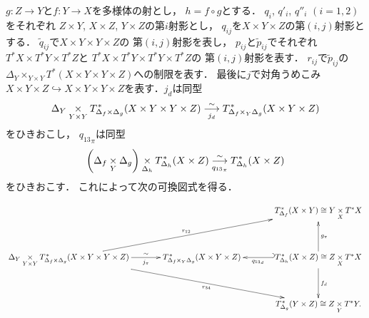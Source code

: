 \documentclass[leqno, 10pt, a4paper, dvipdfmx]{jsarticle}
\theoremstyle{definition}
\numberwithin{equation}{section}
\newcommand{\mres}[2][]{{\left.{#1}\right\rvert}_{#2}}
\newcommand{\dpb}[1][]{\mathbin{\mathop{\times}\limits_{#1}}}
\newcommand{\tpb}[1][]{\mathbin{\mathop{\times}\nolimits_{#1}}}
\theoremstyle{mystyle}
\newcommand{\mpb}[1][]{{#1}_{\pi}} %
\newcommand{\mdiff}[1][]{{#1}_{d}} %
\newcommand{\cotb}[1][]{T^{\ast}{#1}}
\newcommand{\conm}[2][]{T_{#1}^{\hspace{0.7pt}\ast}{#2}}
\newcommand{\diag}[1][]{\Delta_{#1}}
\begin{document}
\(g\colon Z\to Y\)と\(f\colon Y\to X\)を多様体の射とし，
\(h=f\circ g\)とする．
\(q_i\), \(q'_i\), \(q''_i\) \((i=1,2)\)をそれぞれ
\(Z\times Y\), \(X\times Z\), \(Y\times Z\)の第\(i\)射影とし，
\(q_{ij}\)を\(X\times Y\times Z\)の第\((i,j)\)射影とする．
\(\widetilde{q}_{ij}\)で\(X\times Y\times Y\times Z\)の
第\((i,j)\)射影を表し，
\(p_{ij}\)と\(\widetilde{p}_{ij}\)でそれぞれ
\(\cotb[X]\times\cotb[Y]\times\cotb[Z]\)と
\(\cotb[X]\times\cotb[Y]\times\cotb[Y]\times\cotb[Z]\)の
第\((i,j)\)射影を表す．
\(r_{ij}\)で\(\widetilde{p}_{ij}\)の\(
  \diag[Y]\tpb[Y\times Y]\cotb[(X\times Y\times Y\times Z)]
\)への制限を表す．
最後に\(j\)で対角うめこみ\(
  X\times Y\times Z
  \hookrightarrow 
  X\times Y\times Y\times Z
\)を表す．\(\mdiff[j]\)は同型
\begin{equation}
  \diag[Y]\dpb[Y\times Y]
  \conm[{\diag[f]\times\diag[g]}]{(X\times Y\times Y\times Z)}
  \overunderset{\sim}{{\mdiff[j]}}{\longrightarrow}
  \conm[{\diag[f]\tpb[Y]\diag[g]}]{(X\times Y\times Z)}
\end{equation}
をひきおこし，
\(\mpb[{q_{13}}]\)は同型
\begin{equation}
  \left(
    \diag[f]
    \dpb[Y]
    \diag[g]
  \right)\dpb[{\diag[h]}]
  \conm[{\diag[h]}]{(X\times Z)}
  \overunderset{\sim}{{\mpb[{q_{13}}]}}{\longrightarrow}
  \conm[{\diag[h]}]{(X\times Z)}
\end{equation}
をひきおこす．
これによって次の可換図式を得る．

\begin{equation}
  \vcenter{\xymatrix@C=36pt@R=36pt{
    &
    &
    \conm[{\diag[f]}]{(X\times Y)}
    \cong
    Y\dpb[X]\cotb[X]
    \\
    \diag[Y]\dpb[Y\times Y]
    \conm[{\diag[f]\times\diag[g]}]{(X\times Y\times Y\times Z)}
    \ar[urr]^-{r_{12}}
    \ar[drr]_-{r_{34}}
    \ar[r]_-{\mpb[j]}^-{\sim}
    &
    \conm[{\diag[f]\tpb[Y]\diag[g]}]{(X\times Y\times Z)}
    &
    \conm[{\diag[h]}]{(X\times Z)}
    \cong
    Z\dpb[X]\cotb[X]
    \ar@{_{(}->}[l]^-{\mdiff[{q_{13}}]}
    \ar[d]^-{\mdiff[f]}
    \ar[u]_-{\mpb[g]}
    \\
    &
    &
    \conm[{\diag[g]}]{(Y\times Z)}
    \cong
    Z\dpb[Y]\cotb[Y].
  }}
\end{equation}
\end{document}
